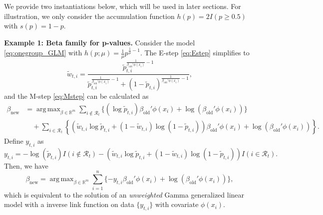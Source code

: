 \documentclass{biometrika}
\newcommand{\cR}{\mathcal{R}}
\newcommand{\lb}{\left(}
\newcommand{\rb}{\right)}
\newcommand{\td}{\tilde}
\newcommand{\R}{\mathbb{R}}
\newcommand{\1}{\mathbf{1}}
\DeclareMathOperator*{\argmax}{arg\,max}
\begin{document}
We provide two instantiations below, which will be used in later sections. For illustration, we only consider the accumulation function $h(p) = 2 I(p\ge 0.5)$ with $s(p) = 1 - p$. 

\vspace{0.3em}
\noindent \textbf{Example 1: Beta family for p-values.} Consider the model \eqref{eq:onegroup_GLM} with $h(p; \mu) = \frac{1}{\mu}p^{\frac{1}{\mu} - 1}$. The E-step \eqref{eq:Estep} simplifies to\begin{equation*}
  \td{w}_{t, i} = \frac{\td{p}_{t,i}^{\frac{1}{\beta_{\mathrm{old}}'\phi(x_{i})} - 1}}{\td{p}_{t,i}^{\frac{1}{\beta_{\mathrm{old}}'\phi(x_{i})} - 1} + (1 - \td{p}_{t, i})^{\frac{1}{\beta_{\mathrm{old}}'\phi(x_{i})} - 1}},
\end{equation*}
and the M-step \eqref{eq:Mstep} can be calculated as 
\begin{align}
   \beta_{\mathrm{new}} &= \argmax_{\beta\in \R^{m}} \sum_{i\not\in \cR_{t}}\{(\log \td{p}_{t, i})\beta_{\mathrm{old}}'\phi(x_{i}) + \log (\beta_{\mathrm{old}}'\phi(x_{i}))\}\nonumber\\ 
& \quad + \sum_{i\in \cR_{t}}\left\{\lb\td{w}_{t, i}\log \td{p}_{t, i} + (1 - \td{w}_{t,i})\log \lb 1 - \td{p}_{t,i}\rb\rb\beta_{\mathrm{old}}'\phi(x_{i}) + \log (\beta_{\mathrm{old}}'\phi(x_{i}))\right\}.\nonumber
\end{align}
Define $y_{t, i}$ as
\[y_{t, i} = -\log(\td{p}_{t, i})I(i\not\in \cR_{t}) - \lb\td{w}_{t, i}\log \td{p}_{t, i} + (1 - \td{w}_{t,i})\log \lb 1 - \td{p}_{t,i}\rb\rb I(i\in \cR_{t}).\]
Then, we have
\begin{equation*}
  \beta_{\mathrm{new}} = \argmax_{\beta\in \R^{m}} \sum_{i=1}^{n}\{-y_{t, i}\beta_{\mathrm{old}}'\phi(x_{i}) + \log (\beta_{\mathrm{old}}'\phi(x_{i}))\},
\end{equation*}
which is equivalent to the solution of an \emph{unweighted} Gamma generalized linear model with a inverse link function on data $\{y_{t, i}\}$ with covariate $\phi(x_{i})$.
\end{document}
